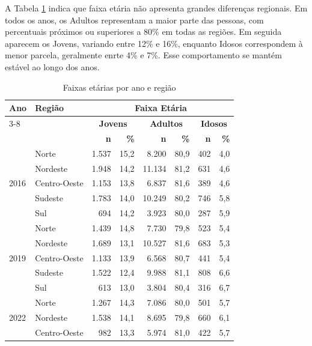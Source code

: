\documentclass[12pt,a4paper,header]{abnt}
\begin{document}
\FloatBarrier
A Tabela \ref{tab:idade} indica que faixa etária não apresenta grandes diferenças regionais. Em todos os anos, os Adultos representam a maior parte das pessoas, com percentuais próximos ou superiores a 80\% em todas as regiões. Em seguida aparecem os Jovens, variando entre 12\% e 16\%, enquanto Idosos correspondem à menor parcela, geralmente enrte 4\% e 7\%. Esse comportamento se mantém estável ao longo dos anos.
\begin{table}[ht]
\centering
\caption{Faixas etárias por ano e região}
\label{tab:idade}
\begin{tabular}{llrrrrrr}
\toprule
\multirow{3}{*}{\textbf{Ano}} & \multirow{3}{*}{\textbf{Região}} & \multicolumn{6}{c}{\textbf{Faixa Etária}} \\
\cmidrule(lr){3-8}
& & \multicolumn{2}{c}{\textbf{Jovens}} & \multicolumn{2}{c}{\textbf{Adultos}} & \multicolumn{2}{c}{\textbf{Idosos}} \\
& & \textbf{n} & \textbf{\%} & \textbf{n} & \textbf{\%} & \textbf{n} & \textbf{\%} \\
\midrule
\multirow{5}{*}{2016} & Norte        & 1.537 & 15,2 & 8.200 & 80,9 & 402 & 4,0 \\
                      & Nordeste     & 1.948 & 14,2 & 11.134 & 81,2 & 631 & 4,6 \\
                      & Centro-Oeste & 1.153 & 13,8 & 6.837 & 81,6 & 389 & 4,6 \\
                      & Sudeste      & 1.783 & 14,0 & 10.249 & 80,2 & 746 & 5,8 \\
                      & Sul          & 694 & 14,2 & 3.923 & 80,0 & 287 & 5,9 \\
\midrule
\multirow{5}{*}{2019} & Norte        & 1.439 & 14,8 & 7.730 & 79,8 & 523 & 5,4 \\
                      & Nordeste     & 1.689 & 13,1 & 10.527 & 81,6 & 683 & 5,3 \\
                      & Centro-Oeste & 1.133 & 13,9 & 6.568 & 80,7 & 441 & 5,4 \\
                      & Sudeste      & 1.522 & 12,4 & 9.988 & 81,1 & 808 & 6,6 \\
                      & Sul          & 613 & 13,0 & 3.804 & 80,4 & 316 & 6,7 \\
\midrule
\multirow{5}{*}{2022} & Norte        & 1.267 & 14,3 & 7.086 & 80,0 & 501 & 5,7 \\
                      & Nordeste     & 1.538 & 14,1 & 8.695 & 79,8 & 660 & 6,1 \\
                      & Centro-Oeste & 982 & 13,3 & 5.974 & 81,0 & 422 & 5,7 \\

\end{tabular}
\end{table}
\end{document}
